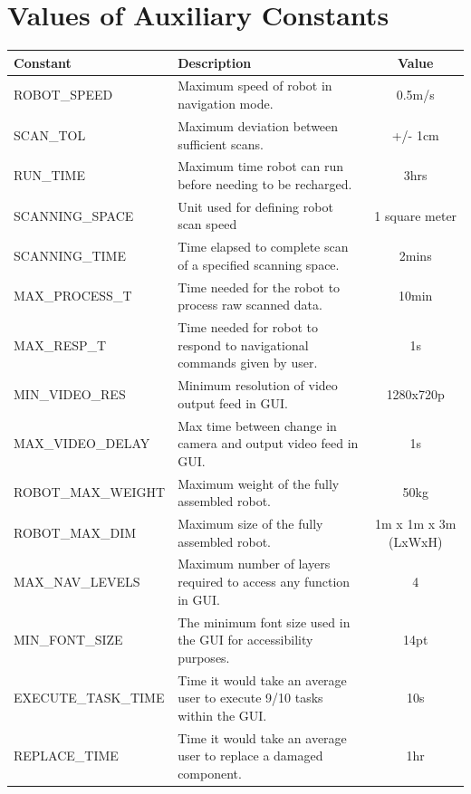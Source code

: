 \documentclass[12pt]{article}
\newcommand{\RobotSpeed}{0.5m/s}
\newcommand{\ScanTolerance}{+/- 1cm}
\newcommand{\BatteryLife}{3hrs}
\newcommand{\ScanningSpace}{1 square meter}
\newcommand{\ScanningTime}{2mins}
\newcommand{\MaxProcessingTime}{10min}
\newcommand{\MaxResponseTime}{1s}
\newcommand{\MinVideoResolution}{1280x720p}
\newcommand{\MaxVideoDelay}{1s}
\newcommand{\RobotMaxWeight}{50kg}
\newcommand{\RobotMaxDimensions}{1m x 1m x 3m (LxWxH)}
\newcommand{\MaxNavLevels}{4}
\newcommand{\MinFontSize}{14pt}
\newcommand{\ExecuteTaskTime}{10s}
\newcommand{\ReplaceTime}{1hr}
\begin{document}
\section{Values of Auxiliary Constants}
\label{sec_ac}




\begin{tabular}{ | l | p{6cm} | c |}
  \hline
  \textbf{Constant} & \textbf{Description} & \textbf{Value} \\
  \hline
  ROBOT\_SPEED & Maximum speed of robot in navigation mode. & \RobotSpeed{} \\
  \hline
  SCAN\_TOL & Maximum deviation between sufficient scans. & \ScanTolerance{} \\
  \hline
  RUN\_TIME & Maximum time robot can run before needing to be recharged. & \BatteryLife{} \\
  \hline
  SCANNING\_SPACE & Unit used for defining robot scan speed & \ScanningSpace{} \\
  \hline
  SCANNING\_TIME & Time elapsed to complete scan of a specified scanning space. & \ScanningTime{} \\
  \hline
  MAX\_PROCESS\_T & Time needed for the robot to process raw scanned data. & \MaxProcessingTime{} \\
  \hline
  MAX\_RESP\_T & Time needed for robot to respond to navigational commands given by user. & \MaxResponseTime{} \\
  \hline
  MIN\_VIDEO\_RES & Minimum resolution of video output feed in GUI. & \MinVideoResolution{} \\
  \hline
  MAX\_VIDEO\_DELAY & Max time between change in camera and output video feed in GUI. & \MaxVideoDelay{} \\
  \hline
  ROBOT\_MAX\_WEIGHT & Maximum weight of the fully assembled robot. & \RobotMaxWeight{} \\
  \hline
  ROBOT\_MAX\_DIM & Maximum size of the fully assembled robot. & \RobotMaxDimensions{} \\
  \hline
  MAX\_NAV\_LEVELS & Maximum number of layers required to access any function in GUI. & \MaxNavLevels{} \\
  \hline
  MIN\_FONT\_SIZE & The minimum font size used in the GUI for accessibility purposes. & \MinFontSize{} \\
  \hline
  EXECUTE\_TASK\_TIME & Time it would take an average user to execute 9/10 tasks within the GUI. & \ExecuteTaskTime{} \\
  \hline
  REPLACE\_TIME & Time it would take an average user to replace a damaged component. & \ReplaceTime{} \\
  \hline
  
\end{tabular}
\end{document}
